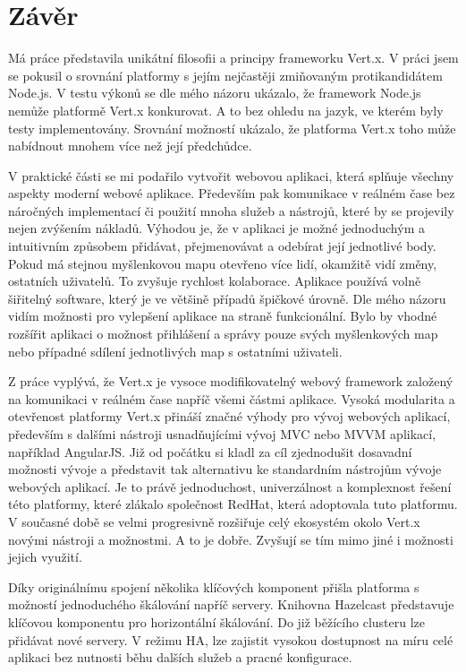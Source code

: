 
\chapter[Závěr]{Závěr}

Má práce představila unikátní filosofii a principy frameworku Vert.x. V práci jsem se pokusil o srovnání platformy s jejím nejčastěji zmiňovaným protikandidátem Node.js. V testu výkonů se dle mého názoru ukázalo, že framework Node.js nemůže platformě Vert.x konkurovat. A to bez ohledu na jazyk, ve kterém byly testy implementovány. Srovnání možností ukázalo, že platforma Vert.x toho může nabídnout mnohem více než její předchůdce. 

V praktické části se  mi podařilo vytvořit webovou aplikaci, která splňuje všechny aspekty moderní webové aplikace. Především pak komunikace v reálném čase bez náročných implementací či použití mnoha služeb a nástrojů, které by se projevily nejen zvýšením nákladů. Výhodou je, že v aplikaci je možné jednoduchým a intuitivním způsobem přidávat, přejmenovávat a odebírat její jednotlivé body. Pokud má stejnou myšlenkovou mapu otevřeno více lidí, okamžitě vidí změny, ostatních uživatelů. To zvyšuje rychlost kolaborace. Aplikace používá volně šiřitelný software, který je ve většině případů špičkové úrovně. %
Dle mého názoru vidím možnosti pro vylepšení aplikace na straně funkcionální. Bylo by vhodné rozšířit aplikaci o možnost přihlášení a správy pouze svých myšlenkových map nebo případné sdílení jednotlivých map s ostatními uživateli.

Z práce vyplývá, že Vert.x je vysoce modifikovatelný webový framework založený na komunikaci v reálném čase napříč všemi částmi aplikace. Vysoká modularita a otevřenost platformy Vert.x přináší značné výhody pro vývoj webových aplikací, především s dalšími nástroji usnadňujícími vývoj MVC nebo MVVM aplikací, například AngularJS. Již od počátku si kladl za cíl zjednodušit dosavadní možnosti vývoje a představit tak alternativu ke standardním nástrojům vývoje webových aplikací. Je to právě jednoduchost, univerzálnost a komplexnost řešení této platformy, které zlákalo společnost RedHat, která adoptovala tuto platformu. V současné době se velmi progresivně rozšiřuje celý ekosystém okolo Vert.x novými nástroji a možnostmi. A to je dobře. Zvyšují se tím mimo jiné i možnosti jejich využití.

Díky originálnímu spojení několika klíčových komponent přišla platforma s možností jednoduchého škálování napříč servery. Knihovna Hazelcast představuje klíčovou komponentu pro horizontální škálování. Do již běžícího clusteru lze přidávat nové servery. V režimu HA, lze zajistit vysokou dostupnost na míru celé aplikaci bez nutnosti běhu dalších služeb a pracné konfigurace.

